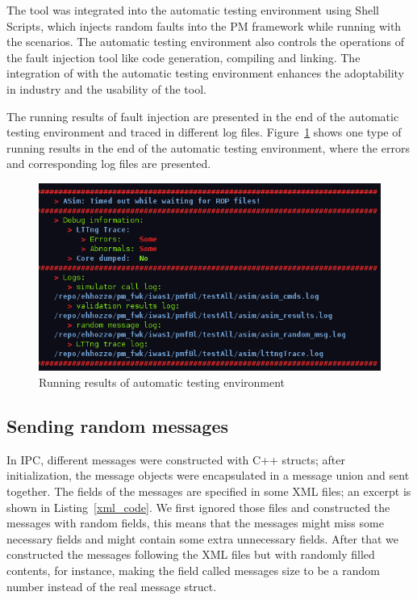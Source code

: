 The \approach{} tool was integrated into the automatic testing environment using Shell Scripts, which injects random faults into the PM framework while running with the scenarios. The automatic testing environment also controls the operations of the fault injection tool like code generation, compiling and linking. The integration of \approach{} with  the automatic testing environment enhances the adoptability in industry and the usability of the tool.


The running results of fault injection are presented in the end of the automatic testing environment and traced in different log files. Figure~\ref{terminal} shows one type of running results in the end of the automatic testing environment, where the errors and corresponding log files are presented.

\begin{figure}[!ht]
\centering
\includegraphics[width=\columnwidth]{figure/terminal.PNG}
\caption{Running results of automatic testing environment \label{terminal}}
\end{figure}


\subsection{Sending random messages}\label{sec:sendingRandomMessages}
In IPC, different messages were constructed with C++ structs; after initialization, the message objects were encapsulated in a message union and sent together. The fields of the messages are specified in some XML files; an excerpt is shown in Listing~\ref{xml_code}. We first ignored those files and constructed the messages with random fields, this means that the messages might miss some necessary fields and might contain some extra unnecessary fields. After that we constructed the messages following the XML files but with randomly filled contents, for instance, making the field called messages size to be a random number instead of the real message struct.         

